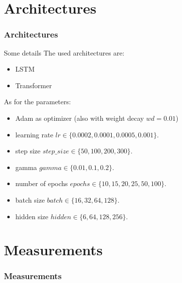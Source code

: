 \documentclass[aspectratio=169,t,xcolor=table]{beamer}
\begin{document}
\section{Architectures}

\begin{frame}{}
    \frametitle{Architectures}
\end{frame}

\begin{frame}{Some details}
    The used architectures are:
    \begin{itemize}
        \item LSTM \cite{yu2019review}
        \item Transformer \cite{vaswani2017attention}
    \end{itemize}
    As for the parameters:
    \begin{itemize}
        \item Adam as optimizer (also with weight decay $wd=0.01$)
        \item learning rate $lr \in \{0.0002,0.0001,0.0005,0.001\}$.
        \item step size $step\_size \in \{50,100,200,300\}$.
        \item gamma $gamma \in \{0.01,0.1,0.2\}$.
        \item number of epochs $epochs \in \{10,15,20,25,50,100\}$.
        \item batch size $batch \in \{16,32,64,128\}$.
        \item hidden size $hidden \in \{6,64,128,256\}$.
    \end{itemize}  
\end{frame}

\section{Measurements}

\begin{frame}{}
    \frametitle{Measurements}
\end{frame}
\end{document}
